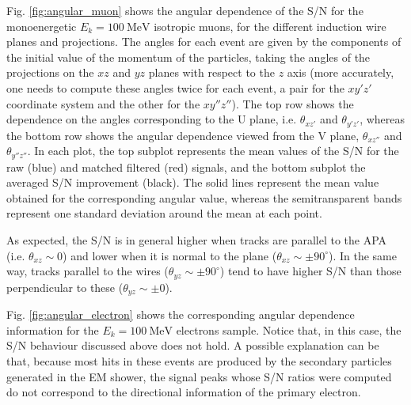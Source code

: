 Fig. \ref{fig:angular_muon} shows the angular dependence of the S/N for the monoenergetic $E_{k}=100 \ \mathrm{MeV}$ isotropic muons, for the different induction wire planes and projections. The angles for each event are given by the components of the initial value of the momentum of the particles, taking the angles of the projections on the $xz$ and $yz$ planes with respect to the $z$ axis (more accurately, one needs to compute these angles twice for each event, a pair for the $xy'z'$ coordinate system and the other for the $xy''z''$). The top row shows the dependence on the angles corresponding to the U plane, i.e. $\theta_{xz'}$ and $\theta_{y'z'}$, whereas the bottom row shows the angular dependence viewed from the V plane, $\theta_{xz''}$ and $\theta_{y''z''}$. In each plot, the top subplot represents the mean values of the S/N for the raw (blue) and matched filtered (red) signals, and the bottom subplot the averaged S/N improvement (black). The solid lines represent the mean value obtained for the corresponding angular value, whereas the semitransparent bands represent one standard deviation around the mean at each point.

As expected, the S/N is in general higher when tracks are parallel to the APA (i.e. $\theta_{xz} \sim 0$) and lower when it is normal to the plane ($\theta_{xz} \sim \pm 90^{\circ}$). In the same way, tracks parallel to the wires ($\theta_{yz} \sim \pm 90^{\circ}$) tend to have higher S/N than those perpendicular to these ($\theta_{yz} \sim \pm 0$).

Fig. \ref{fig:angular_electron} shows the corresponding angular dependence information for the $E_{k}=100 \ \mathrm{MeV}$ electrons sample. Notice that, in this case, the S/N behaviour discussed above does not hold. A possible explanation can be that, because most hits in these events are produced by the secondary particles generated in the EM shower, the signal peaks whose S/N ratios were computed do not correspond to the directional information of the primary electron.

